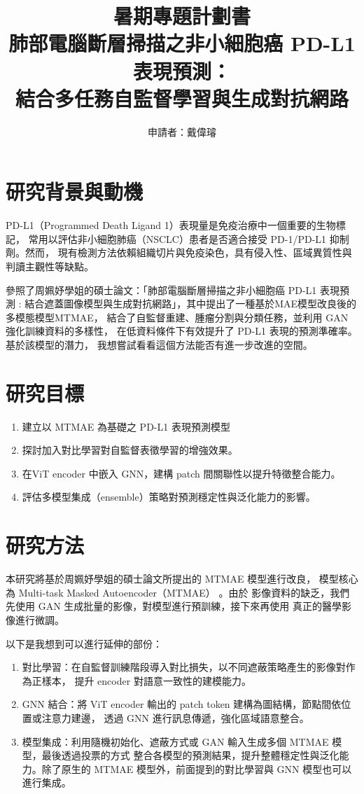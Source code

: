 \documentclass[12pt,a4paper]{article}
\title{暑期專題計劃書\\\large 肺部電腦斷層掃描之非小細胞癌 PD-L1 表現預測：\\結合多任務自監督學習與生成對抗網路}
\author{申請者：戴偉璿}
\begin{document}

\maketitle

\newpage

\section{研究背景與動機}
PD-L1（Programmed Death Ligand 1）表現量是免疫治療中一個重要的生物標記，
常用以評估非小細胞肺癌（NSCLC）患者是否適合接受 PD-1/PD-L1 抑制劑。然而，
現有檢測方法依賴組織切片與免疫染色，具有侵入性、區域異質性與判讀主觀性等缺點。

參照了周姵妤學姐的碩士論文：「肺部電腦斷層掃描之非小細胞癌 PD-L1 表現預測 :
結合遮蓋圖像模型與生成對抗網路」，其中提出了一種基於MAE模型改良後的多模態模型MTMAE，
結合了自監督重建、腫瘤分割與分類任務，並利用 GAN 強化訓練資料的多樣性，
在低資料條件下有效提升了 PD-L1 表現的預測準確率。基於該模型的潛力，
我想嘗試看看這個方法能否有進一步改進的空間。

\section{研究目標}
\begin{enumerate}
  \item 建立以 MTMAE 為基礎之 PD-L1 表現預測模型
  \item 探討加入對比學習對自監督表徵學習的增強效果。
  \item 在ViT encoder 中嵌入 GNN，建構 patch 間關聯性以提升特徵整合能力。
  \item 評估多模型集成（ensemble）策略對預測穩定性與泛化能力的影響。
\end{enumerate}

\section{研究方法}
本研究將基於周姵妤學姐的碩士論文所提出的 MTMAE 模型進行改良，
模型核心為 Multi-task Masked Autoencoder（MTMAE） 。由於
影像資料的缺乏，我們先使用 GAΝ 生成批量的影像，對模型進行預訓練，接下來再使用
真正的醫學影像進行微調。

以下是我想到可以進行延伸的部份：

\begin{enumerate}
    \item 對比學習：在自監督訓練階段導入對比損失，以不同遮蔽策略產生的影像對作為正樣本，
    提升 encoder 對語意一致性的建模能力。
    \item GNN 結合：將 ViT encoder 輸出的 patch token 建構為圖結構，節點間依位置或注意力建邊，
    透過 GNN 進行訊息傳遞，強化區域語意整合。
    \item 模型集成：利用隨機初始化、遮蔽方式或 GAN 輸入生成多個 MTMAE 模型，最後透過投票的方式
    整合各模型的預測結果，提升整體穩定性與泛化能力。除了原生的 MTMAE 模型外，前面提到的對比學習與 GNN 模型也可以進行集成。
\end{enumerate}
\newpage
\end{document}
